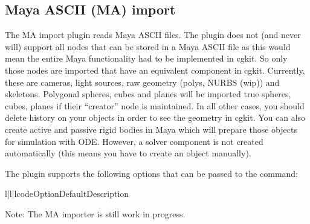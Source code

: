 
\subsection{Maya ASCII (MA) import}

The MA import plugin reads Maya ASCII files. The plugin does not (and
never will) support all nodes that can be stored in a Maya ASCII file
as this would mean the entire Maya functionality had to be implemented
in cgkit.  So only those nodes are imported that have an equivalent
component in cgkit.  Currently, these are cameras, light sources, raw
geometry (polys, NURBS (wip)) and skeletons. Polygonal spheres, cubes
and planes will be imported true spheres, cubes, planes if their ``creator''
node is maintained. In all other cases, you should delete history on your
objects in order to see the geometry in cgkit. You can also create 
active and passive rigid bodies in Maya which will prepare those objects
for simulation with ODE. However, a solver component is not created
automatically (this means you have to create an  object
manually).

The plugin supports the following options that can be passed to
the  command:

\begin{tableiii}{l|l|l}{code}{Option}{Default}{Description}
\end{tableiii}

Note: The MA importer is still work in progress.
